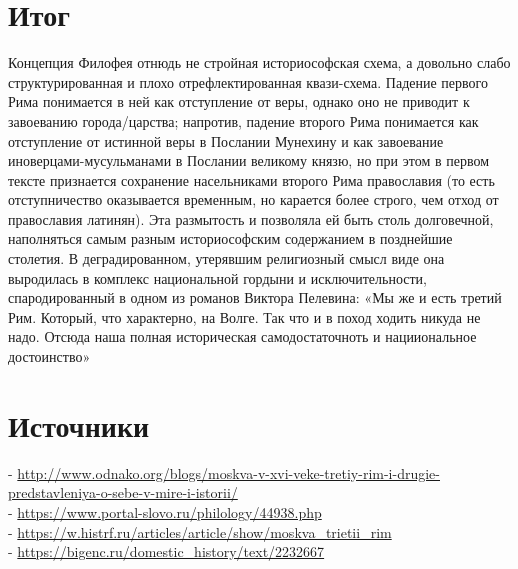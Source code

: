 \documentclass[a4paper, 12pt]{article}
\begin{document}
\section{Итог}
Концепция Филофея отнюдь не стройная историософская схема, а довольно слабо структурированная и плохо отрефлектированная квази-схема. Падение первого Рима понимается в ней как отступление от веры, однако оно не приводит к завоеванию города/царства; напротив, падение второго Рима понимается как отступление от истинной веры в Послании Мунехину и как завоевание иноверцами-мусульманами в Послании великому князю, но при этом в первом тексте признается сохранение насельниками второго Рима православия (то есть отступничество оказывается временным, но карается более строго, чем отход от православия латинян). Эта размытость и позволяла ей быть столь долговечной, наполняться самым разным историософским содержанием в позднейшие столетия. В деградированном, утерявшим религиозный смысл виде она выродилась в комплекс национальной гордыни и исключительности, спародированный в одном из романов Виктора Пелевина: «Мы же и есть третий Рим. Который, что характерно, на Волге. Так что и в поход ходить никуда не надо. Отсюда наша полная историческая самодостаточноть и нацииональное достоинство»

\section{Источники}
- \url{http://www.odnako.org/blogs/moskva-v-xvi-veke-tretiy-rim-i-drugie-predstavleniya-o-sebe-v-mire-i-istorii/}\\
- \url{https://www.portal-slovo.ru/philology/44938.php}\\
- \url{https://w.histrf.ru/articles/article/show/moskva_trietii_rim}\\
- \url{https://bigenc.ru/domestic_history/text/2232667}\\
\end{document}
